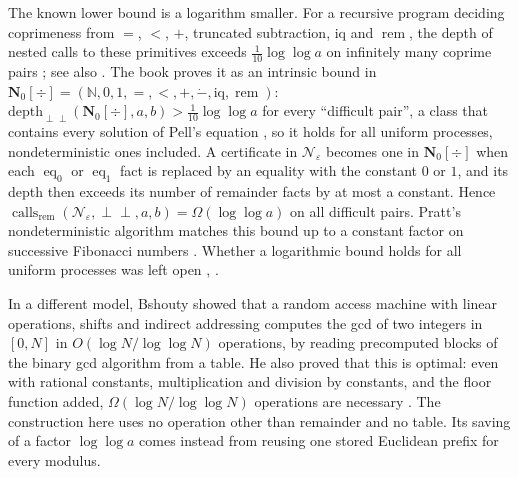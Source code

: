 \documentclass[11pt]{article}
\newcommand{\rem}{\operatorname{rem}}
\newcommand{\calls}{\operatorname{calls}}
\newcommand{\eq}{\operatorname{eq}}
\begin{document}
The known lower bound is a logarithm smaller. For a recursive program deciding
coprimeness from $=$, $<$, $+$, truncated subtraction, $\mathrm{iq}$ and $\rem$,
the depth of nested calls to these primitives exceeds $\tfrac1{10}\log\log a$ on
infinitely many coprime pairs \cite[Theorem~A]{vddm2004}; see also
\cite{vddm2009}. The book proves it as an
intrinsic bound in
$\mathbf N_0[\div]=(\mathbb N,0,1,=,<,+,\dot{-},\mathrm{iq},\rem)$:
$\mathrm{depth}_{\perp\!\!\!\perp}(\mathbf N_0[\div],a,b)>\tfrac1{10}\log\log a$
for every ``difficult pair'', a class that contains every solution of Pell's
equation \cite[Theorem~6C.5, p.~187]{moschovakis2019}, so it
holds for all uniform processes, nondeterministic ones included. A certificate
in $\mathcal N_\varepsilon$ becomes one in $\mathbf N_0[\div]$ when each $\eq_0$
or $\eq_1$ fact is replaced by an equality with the constant $0$ or $1$, and its
depth then exceeds its number of remainder facts by at most a constant. Hence
$\calls_{\rem}(\mathcal N_\varepsilon,\perp\!\!\!\perp,a,b)=\Omega(\log\log a)$ on
all difficult pairs. Pratt's nondeterministic algorithm
\cite[Theorem~2E.2 and Problems x2E.17--x2E.19]{moschovakis2019} matches this
bound up to a constant factor on successive Fibonacci numbers
\cite[Corollary~6C.7]{moschovakis2019}. Whether a logarithmic bound holds for
all uniform processes was left open \cite[p.~188]{moschovakis2019},
\cite[Conjecture~3.4]{moschovakis2012}.

In a different model, Bshouty showed that a random access machine with linear
operations, shifts and indirect addressing computes the gcd of two integers in
$[0,N]$ in $O(\log N/\log\log N)$ operations, by reading precomputed blocks of the binary
gcd algorithm from a table. He also proved that this is optimal: even with
rational constants, multiplication and division by constants, and the floor
function added, $\Omega(\log N/\log\log N)$ operations are necessary
\cite[Theorems~i and~ii]{bshouty1989}. The construction here uses no
operation other than remainder and no table. Its saving of a factor
$\log\log a$ comes instead from reusing one stored Euclidean prefix for every
modulus.
\end{document}
